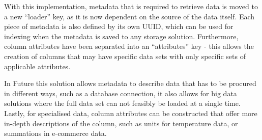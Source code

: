 With this implementation, metadata that is required to retrieve data is moved to a new ``loader'' key, as it is now
dependent on the source of the data itself.
Each piece of metadata is also defined by its own UUID, which can be used for indexing when the metadata is saved to any
storage solution.
Furthermore, column attributes have been separated into an ``attributes'' key - this allows the creation of columns that
may have specific data sets with only specific sets of applicable attributes.

In Future this solution allows metadata to describe data that has to be procured in different ways, such as a database
connection, it also allows for big data solutions where the full data set can not feasibly be loaded at a single time.
Lastly, for specialised data, column attributes can be constructed that offer more in-depth descriptions of the column,
such as units for temperature data, or summations in e-commerce data.